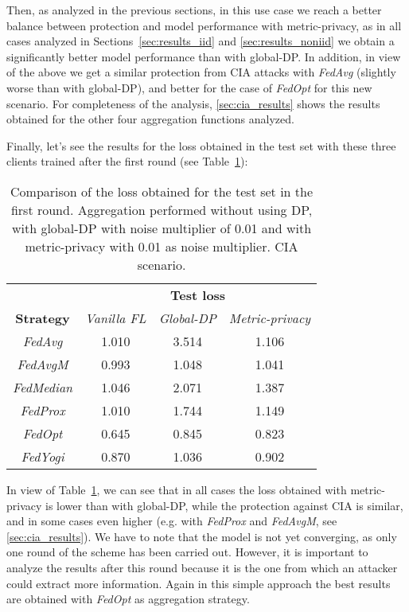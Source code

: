 \documentclass[5p,times]{elsarticle}
\begin{document}
Then, as analyzed in the previous sections, in this use case we reach a better balance between protection and model performance with metric-privacy, as in all cases analyzed in Sections~\ref{sec:results_iid} and \ref{sec:results_noniid} we obtain a significantly better model performance than with global-DP. In addition, in view of the above we get a similar protection from CIA attacks with \textit{FedAvg} (slightly worse than with global-DP), and better for the case of \textit{FedOpt} for this new scenario. For completeness of the analysis, \ref{sec:cia_results} shows the results obtained for the other four aggregation functions analyzed.

Finally, let's see the results for the loss obtained in the test set with these three clients trained after the first round (see Table~\ref{tab:cnn_results_cia}):

\begin{table}[ht]
    \centering
    \begin{tabular}{cccc}
         \toprule
          & \multicolumn{3}{c}{\textbf{Test loss}} \\
         \cmidrule{2-4}
         \textbf{Strategy} & \textit{Vanilla FL} & \textit{Global-DP} & \textit{Metric-privacy}\\
         \midrule
         \textit{FedAvg} & 1.010 & 3.514 & 1.106 \\ 
         \textit{FedAvgM} & 0.993 & 1.048 & 1.041 \\ 
         \textit{FedMedian} & 1.046 & 2.071 & 1.387 \\ 
         \textit{FedProx} & 1.010 & 1.744 &  1.149  \\ 
         \textit{FedOpt} &  0.645  & 0.845  & 0.823 \\ 
         \textit{FedYogi} & 0.870 & 1.036 & 0.902 \\ 
        \bottomrule
    \end{tabular}%
    \caption{Comparison of the loss obtained for the test set in the first round. Aggregation performed without using DP, with global-DP with noise multiplier of 0.01 and with metric-privacy with 0.01 as noise multiplier. CIA scenario.}
    \label{tab:cnn_results_cia}
\end{table}

In view of Table~\ref{tab:cnn_results_cia}, we can see that in all cases the loss obtained with metric-privacy is lower than with global-DP, while the protection against CIA is similar, and in some cases even higher (e.g. with \textit{FedProx} and \textit{FedAvgM}, see \ref{sec:cia_results}). We have to note that the model is not yet converging, as only one round of the scheme has been carried out. However, it is important to analyze the results after this round because it is the one from which an attacker could extract more information. Again in this simple approach the best results are obtained with \textit{FedOpt} as aggregation strategy.
\end{document}
